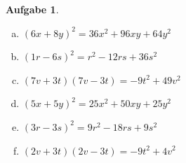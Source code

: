 \documentclass[12pt,fleqn]{article}
\theoremstyle{aufg}
\newtheorem{aufgabe}{Aufgabe}
\theoremstyle{bsp}
\begin{document}
\begin{flushleft}
\begin{aufgabe}
\begin{multicols}{3}
\begin{enumerate}[a)]
\item 
$(6x+8y)^2=36 x^{2} + 96 x y + 64 y^{2}$
\item 
$(1r-6s)^2=r^{2} - 12 r s + 36 s^{2}$
\item 
$(7v+3t)(7v-3t)=- 9 t^{2} + 49 v^{2}$
\item 
$(5x+5y)^2=25 x^{2} + 50 x y + 25 y^{2}$
\item 
$(3r-3s)^2=9 r^{2} - 18 r s + 9 s^{2}$
\item 
$(2v+3t)(2v-3t)=- 9 t^{2} + 4 v^{2}$
\end{enumerate} 
\end{multicols} 
\end{aufgabe} 
\end{flushleft} 
\end{document}
